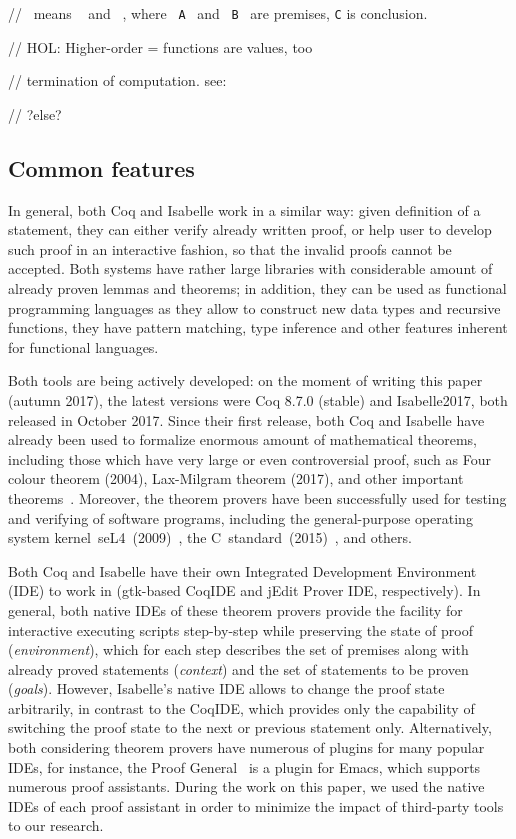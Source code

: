 \documentclass[article]{aaltoseries}
\begin{document}
//~ means ~ and ~, where ~\texttt{A}~ and ~\texttt{B}~ are premises, \texttt{C} is conclusion.

// HOL: Higher-order = functions are values, too

// termination of computation. see: %

// ?else?



\subsection{Common features}

In general, both Coq and Isabelle work in a similar way: given definition of a statement, they can either verify already written proof, or help user to develop such proof in an interactive fashion, so that the invalid proofs cannot be accepted. Both systems have rather large libraries with considerable amount of already proven lemmas and theorems; in addition, they can be used as functional programming languages as they allow to construct new data types and recursive functions, they have pattern matching, type inference and other features inherent for functional languages.

Both tools are being actively developed: on the moment of writing this paper (autumn 2017), the latest versions were Coq 8.7.0 (stable) and Isabelle2017, both released in October 2017. Since their first release, both Coq and Isabelle have already been used to formalize enormous amount of mathematical theorems, including those which have very large or even controversial proof, such as Four colour theorem (2004), Lax-Milgram theorem (2017), and other important theorems~\cite{Wiedijk100}. Moreover, the theorem provers have been successfully used for testing and verifying of software programs, including the general-purpose operating system kernel~seL4~(2009)~\cite{Klein09}, the C~standard~(2015)~\cite{Krebbers15}, and others.

Both Coq and Isabelle have their own Integrated Development Environment (IDE) to work in (gtk-based CoqIDE and jEdit Prover IDE, respectively). In general, both native IDEs of these theorem provers provide the facility for interactive executing scripts step-by-step while preserving the state of proof (\textit{environment}), which for each step describes the set of premises along with already proved statements (\textit{context}) and the set of statements to be proven (\textit{goals}). However, Isabelle's native IDE allows to change the proof state arbitrarily, in contrast to the CoqIDE, which provides only the capability of switching the proof state to the next or previous statement only. Alternatively, both considering theorem provers have numerous of plugins for many popular IDEs, for instance, the Proof General~\cite{tool_PG} is a plugin for Emacs, which supports numerous proof assistants. During the work on this paper, we used the native IDEs of each proof assistant in order to minimize the impact of third-party tools to our research.
\end{document}
